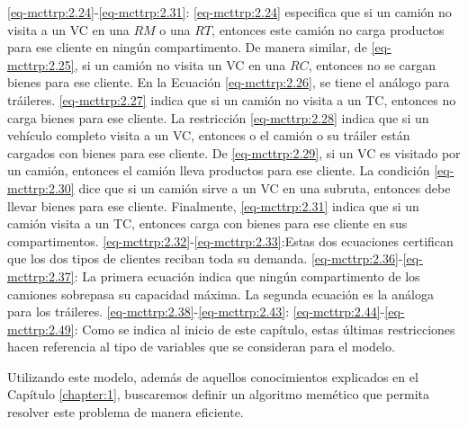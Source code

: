 \begin{itemize}
     \eqref{eq-mcttrp:2.24}-\eqref{eq-mcttrp:2.31}: \eqref{eq-mcttrp:2.24} especifica que si un camión no visita a un VC en una $RM$ o una $RT$, entonces este camión no carga productos para ese cliente en ningún compartimento. De manera similar, de \eqref{eq-mcttrp:2.25}, si un camión no visita un VC en una $RC$, entonces no se cargan bienes para ese cliente. En la Ecuación \eqref{eq-mcttrp:2.26}, se tiene el análogo para tráileres. \eqref{eq-mcttrp:2.27} indica que si un camión no visita a un TC, entonces no carga bienes para ese cliente. La restricción \eqref{eq-mcttrp:2.28} indica que si un vehículo completo visita a un VC, entonces o el camión o su tráiler están cargados con bienes para ese cliente. De \eqref{eq-mcttrp:2.29}, si un VC es visitado por un camión, entonces el camión lleva productos para ese cliente. La condición \eqref{eq-mcttrp:2.30} dice que si un camión sirve a un VC en una subruta, entonces debe llevar bienes para ese cliente. Finalmente, \eqref{eq-mcttrp:2.31} indica que si un camión visita a un TC, entonces carga con bienes para ese cliente en sus compartimentos.
     \eqref{eq-mcttrp:2.32}-\eqref{eq-mcttrp:2.33}:Estas dos ecuaciones certifican que los dos tipos de clientes reciban toda su demanda.
     \eqref{eq-mcttrp:2.36}-\eqref{eq-mcttrp:2.37}: La primera ecuación indica que ningún compartimento de los camiones sobrepasa su capacidad máxima. La segunda ecuación es la análoga para los tráileres.
     \eqref{eq-mcttrp:2.38}-\eqref{eq-mcttrp:2.43}: 
     \eqref{eq-mcttrp:2.44}-\eqref{eq-mcttrp:2.49}: Como se indica al inicio de este capítulo, estas últimas restricciones hacen referencia al tipo de variables que se consideran para el modelo. 
\end{itemize}

Utilizando este modelo, además de aquellos conocimientos explicados en el Capítulo \ref{chapter:1}, buscaremos definir un algoritmo memético que permita resolver este problema de manera eficiente.
